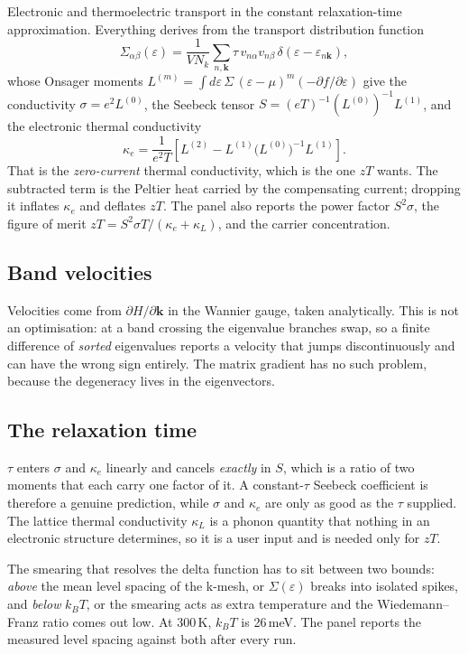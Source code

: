 Electronic and thermoelectric transport in the constant relaxation-time
approximation. Everything derives from the transport distribution function
\[
  \Sigma_{\alpha\beta}(\varepsilon) = \frac{1}{V N_k}\sum_{n,\mathbf{k}}
    \tau\, v_{n\alpha} v_{n\beta}\,
    \delta(\varepsilon - \varepsilon_{n\mathbf{k}}),
\]
whose Onsager moments
$L^{(m)} = \int \! d\varepsilon\, \Sigma\, (\varepsilon-\mu)^m
(-\partial f/\partial\varepsilon)$ give the conductivity
$\sigma = e^2 L^{(0)}$, the Seebeck tensor
$S = (eT)^{-1}(L^{(0)})^{-1}L^{(1)}$, and the electronic thermal
conductivity
\[
  \kappa_e = \frac{1}{e^2 T}\left[L^{(2)}
    - L^{(1)}\bigl(L^{(0)}\bigr)^{-1}L^{(1)}\right].
\]
That is the \emph{zero-current} thermal conductivity, which is the one $zT$
wants. The subtracted term is the Peltier heat carried by the compensating
current; dropping it inflates $\kappa_e$ and deflates $zT$. The panel also
reports the power factor $S^2\sigma$, the figure of merit
$zT = S^2\sigma T/(\kappa_e + \kappa_L)$, and the carrier concentration.

\subsection{Band velocities}

Velocities come from $\partial H/\partial \mathbf{k}$ in the Wannier gauge,
taken analytically. This is not an optimisation: at a band crossing the
eigenvalue branches swap, so a finite difference of \emph{sorted} eigenvalues
reports a velocity that jumps discontinuously and can have the wrong sign
entirely. The matrix gradient has no such problem, because the degeneracy
lives in the eigenvectors.

\subsection{The relaxation time}

$\tau$ enters $\sigma$ and $\kappa_e$ linearly and cancels \emph{exactly} in
$S$, which is a ratio of two moments that each carry one factor of it. A
constant-$\tau$ Seebeck coefficient is therefore a genuine prediction, while
$\sigma$ and $\kappa_e$ are only as good as the $\tau$ supplied. The lattice
thermal conductivity $\kappa_L$ is a phonon quantity that nothing in an
electronic structure determines, so it is a user input and is needed only for
$zT$.

\begin{calwarn}
The smearing that resolves the delta function has to sit between two bounds:
\emph{above} the mean level spacing of the k-mesh, or $\Sigma(\varepsilon)$
breaks into isolated spikes, and \emph{below} $k_BT$, or the smearing acts as
extra temperature and the Wiedemann--Franz ratio comes out low. At 300\,K,
$k_BT$ is 26\,meV. The panel reports the measured level spacing against both
after every run.
\end{calwarn}

